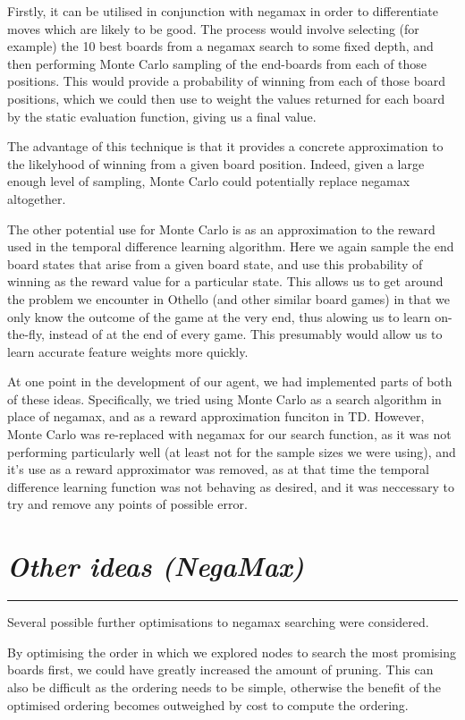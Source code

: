 \documentclass[10pt]{report}
\begin{document}
\begin{multicols}{2}
Firstly, it can be utilised in conjunction with negamax in order to differentiate moves which are likely to be good. The process would involve selecting (for example) the 10 best boards from a negamax search to some fixed depth, and then performing Monte Carlo sampling of the end-boards from each of those positions. This would provide a probability of winning from each of those board positions, which we could then use to weight the values returned for each board by the static evaluation function, giving us a final value.

The advantage of this technique is that it provides a concrete approximation to the likelyhood of winning from a given board position. Indeed, given a large enough level of sampling, Monte Carlo could potentially replace negamax altogether.

The other potential use for Monte Carlo is as an approximation to the reward used in the temporal difference learning algorithm. Here we again sample the end board states that arise from a given board state, and use this probability of winning as the reward value for a particular state. This allows us to get around the problem we encounter in Othello (and other similar board games) in that we only know the outcome of the game at the very end, thus alowing us to learn on-the-fly, instead of at the end of every game. This presumably would allow us to learn accurate feature weights more quickly.

At one point in the development of our agent, we had implemented parts of both of these ideas. Specifically, we tried using Monte Carlo as a search algorithm in place of negamax, and as a reward approximation funciton in TD. However, Monte Carlo was re-replaced with negamax for our search function, as it was not performing particularly well (at least not for the sample sizes we were using), and it's use as a reward approximator was removed, as at that time the temporal difference learning function was not behaving as desired, and it was neccessary to try and remove any points of possible error.

\section*{\emph{Other ideas (NegaMax)}}
\hrule

Several possible further optimisations to negamax searching were considered.

By optimising the order in which we explored nodes to search the most promising boards first, we could have greatly increased the amount of pruning. This can also be difficult as the ordering needs to be simple, otherwise the benefit of the optimised ordering becomes outweighed by cost to compute the ordering.


\end{multicols}
\end{document}
